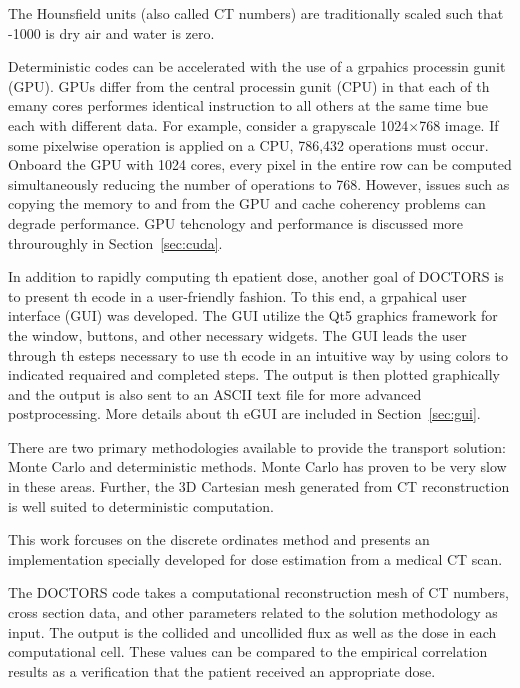 The Hounsfield units (also called CT numbers) are traditionally scaled such that -1000 is dry air and water is zero.

Deterministic codes can be accelerated with the use of a grpahics processin gunit (GPU). GPUs differ from the central processin gunit (CPU) in that  each of th emany cores performes identical instruction to all others at the same time bue each with different data. For example, consider a grapyscale 1024$\times$768 image. If some pixelwise operation is applied on a CPU, 786,432 operations must occur. Onboard the GPU with 1024 cores, every pixel in the entire row can be computed simultaneously reducing the number of operations to 768. However, issues such as copying the memory to and from the GPU and cache coherency problems can degrade performance. GPU tehcnology and performance is discussed more throuroughly in Section~\ref{sec:cuda}.

In addition to rapidly computing th epatient dose, another goal of DOCTORS is to present th ecode in a user-friendly fashion. To this end, a grpahical user interface (GUI) was developed. The GUI utilize the Qt5 graphics framework for the window, buttons, and other necessary widgets. The GUI leads the user through th esteps necessary to use th ecode in an intuitive way by using colors to indicated requaired and completed steps. The output is then plotted graphically and the output is also sent to an ASCII text file for more advanced postprocessing. More details about th eGUI are included in Section~\ref{sec:gui}.

There are two primary methodologies available to provide the transport solution: Monte Carlo and deterministic methods. Monte Carlo has proven to be very slow in these areas. Further, the 3D Cartesian mesh generated from CT reconstruction is well suited to deterministic computation. 

This work forcuses on the discrete ordinates method and presents an implementation specially developed for dose estimation from a medical CT scan. 

The DOCTORS code takes a computational reconstruction mesh of CT numbers, cross section data, and other parameters related to the solution methodology as input. The output is the collided and uncollided flux as well as the dose in each computational cell. These values can be compared to the empirical correlation results as a verification that the patient received an appropriate dose.


\endinput
